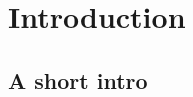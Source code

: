 








{\def\addcontentsline#1#2#3{}\maketitle}

\shortversion{\vspace{-20pt}}

\begin{abstract}
	
\end{abstract}

\ifTableOfContents 
	\tableofcontents
	\newpage
\fi

\section{Introduction}
	\subsection{A short intro}
	




\appendix



